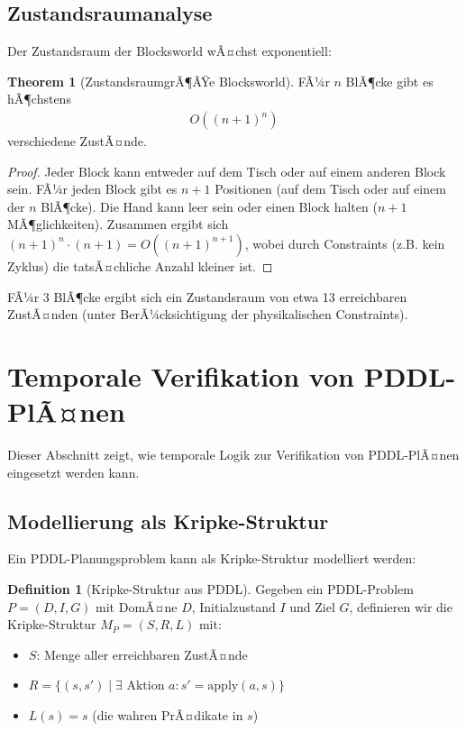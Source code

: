 ﻿\documentclass[a4paper,12pt]{article}
\theoremstyle{definition}
\newtheorem{definition}{Definition}[section]
\newtheorem{theorem}{Theorem}[section]
\begin{document}
\subsection{Zustandsraumanalyse}

Der Zustandsraum der Blocksworld wÃ¤chst exponentiell:

\begin{theorem}[ZustandsraumgrÃ¶ÃŸe Blocksworld]
	FÃ¼r $n$ BlÃ¶cke gibt es hÃ¶chstens
	\begin{align}
	O((n+1)^n)
	\end{align}
	verschiedene ZustÃ¤nde.
\end{theorem}

\begin{proof}
	Jeder Block kann entweder auf dem Tisch oder auf einem anderen Block sein. FÃ¼r jeden Block gibt es $n+1$ Positionen (auf dem Tisch oder auf einem der $n$ BlÃ¶cke). Die Hand kann leer sein oder einen Block halten ($n+1$ MÃ¶glichkeiten). Zusammen ergibt sich $(n+1)^n \cdot (n+1) = O((n+1)^{n+1})$, wobei durch Constraints (z.B. kein Zyklus) die tatsÃ¤chliche Anzahl kleiner ist.
\end{proof}

FÃ¼r 3 BlÃ¶cke ergibt sich ein Zustandsraum von etwa 13 erreichbaren ZustÃ¤nden (unter BerÃ¼cksichtigung der physikalischen Constraints).

\section{Temporale Verifikation von PDDL-PlÃ¤nen}

Dieser Abschnitt zeigt, wie temporale Logik zur Verifikation von PDDL-PlÃ¤nen eingesetzt werden kann.

\subsection{Modellierung als Kripke-Struktur}

Ein PDDL-Planungsproblem kann als Kripke-Struktur modelliert werden:

\begin{definition}[Kripke-Struktur aus PDDL]
	Gegeben ein PDDL-Problem $P = (D, I, G)$ mit DomÃ¤ne $D$, Initialzustand $I$ und Ziel $G$, definieren wir die Kripke-Struktur $M_P = (S, R, L)$ mit:
	\begin{itemize}
		\item[-] $S$: Menge aller erreichbaren ZustÃ¤nde
		\item[-] $R = \{(s, s') \mid \exists \text{ Aktion } a: s' = \text{apply}(a, s)\}$
		\item[-] $L(s) = s$ (die wahren PrÃ¤dikate in $s$)
	\end{itemize}
\end{definition}
\end{document}
